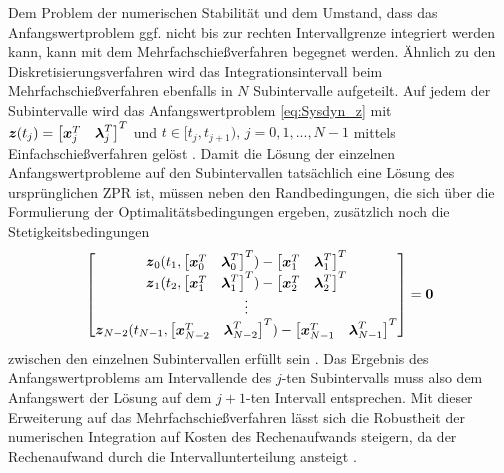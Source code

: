 Dem Problem der numerischen Stabilität und dem Umstand, dass das Anfangswertproblem ggf. nicht bis zur rechten Intervallgrenze integriert werden kann, kann mit dem Mehrfachschießverfahren begegnet werden. Ähnlich zu den Diskretisierungsverfahren wird das Integrationsintervall beim Mehrfachschießverfahren ebenfalls in $N$ Subintervalle aufgeteilt. Auf jedem der Subintervalle wird das Anfangswertproblem \eqref{eq:Sysdyn_z} mit $\boldsymbol{z}(t_j) = \begin{bmatrix}\boldsymbol{x}_j^T & \boldsymbol{\lambda}_j^T\end{bmatrix}^T$ und $t\in[t_j, t_{j+1}),\,j = 0,1,...,N-1$ mittels Einfachschießverfahren gelöst \cite{Gerdts.2010}. Damit die Lösung der einzelnen Anfangswertprobleme auf den Subintervallen tatsächlich eine Lösung des ursprünglichen \gls{ZPR} ist, müssen neben den Randbedingungen, die sich über die Formulierung der Optimalitätsbedingungen ergeben, zusätzlich noch die Stetigkeitsbedingungen 
\begin{equation}
	\begin{bmatrix}
	\boldsymbol{z}_0(t_1,\begin{bmatrix}\boldsymbol{x}_0^T & \boldsymbol{\lambda}_0^T\end{bmatrix}^T) - \begin{bmatrix}\boldsymbol{x}_1^T & \boldsymbol{\lambda}_1^T\end{bmatrix}^T \\
	\boldsymbol{z}_1(t_2,\begin{bmatrix}\boldsymbol{x}_1^T & \boldsymbol{\lambda}_1^T\end{bmatrix}^T) - \begin{bmatrix}\boldsymbol{x}_2^T & \boldsymbol{\lambda}_2^T\end{bmatrix}^T \\
	\vdots \\
	\boldsymbol{z}_{N-2}(t_{N-1},\begin{bmatrix}\boldsymbol{x}_{N-2}^T & \boldsymbol{\lambda}_{N-2}^T\end{bmatrix}^T) - \begin{bmatrix}\boldsymbol{x}_{N-1}^T & \boldsymbol{\lambda}_{N-1}^T\end{bmatrix}^T
	\end{bmatrix} = \boldsymbol{0}
\end{equation}
zwischen den einzelnen Subintervallen erfüllt sein \cite{Gerdts.2010}. Das Ergebnis des Anfangswertproblems am Intervallende des $j$-ten Subintervalls muss also dem Anfangswert der Lösung auf dem $j+1$-ten Intervall entsprechen. Mit dieser Erweiterung auf das Mehrfachschießverfahren lässt sich die Robustheit der numerischen Integration auf Kosten des Rechenaufwands steigern, da der Rechenaufwand durch die Intervallunterteilung ansteigt \cite{Betts.1998}.
